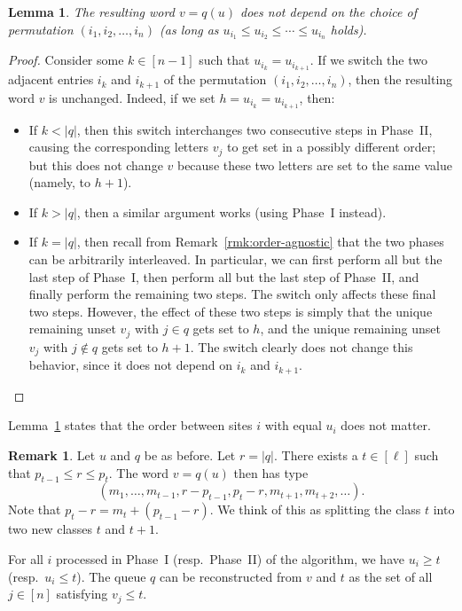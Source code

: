 \documentclass[reqno]{amsart}
\newcommand{\0}{\phantom{c}}
\newcommand{\abs}[1]{\left| #1 \right|}
\newcommand{\tup}[1]{\left( #1 \right)}
\newcommand{\ive}[1]{\left[ #1 \right]}
\theoremstyle{plain}
\newtheorem{lemma}[thm]{Lemma}
\theoremstyle{definition}
\newtheorem{remark}[thm]{Remark}
\numberwithin{equation}{section}
\begin{document}
\begin{lemma}
\label{lemma:order_indep}
The resulting word $v = q(u)$ does not depend on the choice of permutation $(i_1, i_2, \dotsc, i_n)$
(as long as $u_{i_1} \leq u_{i_2} \leq \cdots \leq u_{i_n}$ holds).
\end{lemma}

\begin{proof}
Consider some $k \in \ive{n-1}$ such that $u_{i_k} = u_{i_{k+1}}$.
If we switch the two adjacent entries $i_k$ and $i_{k+1}$ of the
permutation $\tup{i_1, i_2, \ldots, i_n}$,
then the resulting word $v$ is unchanged.
Indeed, if we set $h = u_{i_k} = u_{i_{k+1}}$, then:
\begin{itemize}
 \item If $k < \abs{q}$, then this switch interchanges two consecutive
       steps in Phase~II, causing the corresponding letters $v_j$ to
       get set in a possibly different order; but this does not change $v$
       because these two letters are set to the same value
       (namely, to $h+1$).
 \item If $k > \abs{q}$, then a similar argument works (using Phase~I instead).
 \item If $k = \abs{q}$, then recall from Remark~\ref{rmk:order-agnostic} that
       the two phases can be arbitrarily interleaved.
       In particular, we can first perform all but the last step of Phase~I,
       then perform all but the last step of Phase~II,
       and finally perform the remaining two steps.
       The switch only affects these final two steps.
       However, the effect of these two steps is simply that the unique
       remaining unset $v_j$ with $j \in q$ gets set to $h$,
       and the unique remaining unset $v_j$ with $j \notin q$ gets set to $h+1$.
       The switch clearly does not change this behavior,
       since it does not depend on $i_k$ and $i_{k+1}$.
\end{itemize}
\end{proof}

Lemma~\ref{lemma:order_indep} states that the order between sites $i$ with equal $u_i$ does not matter.

\begin{remark}
\label{rmk:t-splitting}
Let $u$ and $q$ be as before. Let $r = \abs{q}$.
There exists a $t \in \ive{\ell}$ such that
$
p_{t-1} \leq r \leq p_t.
$
The word $v = q(u)$ then has type
\begin{equation}
\label{eq:queue_type_change}
(m_1, \dots, m_{t-1}, r-p_{t-1}, p_{t}-r, m_{t+1}, m_{t+2}, \ldots).
\end{equation}
Note that $p_{t} - r = m_{t} + (p_{t-1} - r)$.
We think of this as splitting the class $t$ into two new classes $t$ and $t+1$.

For all $i$ processed in Phase~I (resp.\ Phase~II) of the algorithm, we have $u_i \geq t$ (resp.~$u_i \leq t$).
The queue $q$ can be reconstructed from $v$ and $t$ as the set of all $j \in \ive{n}$ satisfying $v_j \leq t$.
\end{remark}
\end{document}

